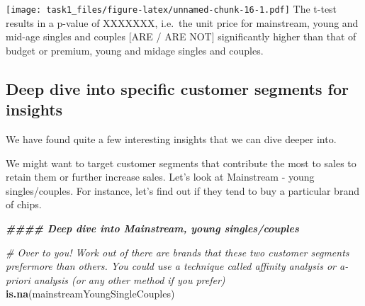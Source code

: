\documentclass[
]{article}
\newenvironment{Shaded}{\begin{snugshade}}{\end{snugshade}}
\newcommand{\CommentTok}[1]{\textcolor[rgb]{0.56,0.35,0.01}{\textit{#1}}}
\newcommand{\DocumentationTok}[1]{\textcolor[rgb]{0.56,0.35,0.01}{\textbf{\textit{#1}}}}
\newcommand{\FunctionTok}[1]{\textcolor[rgb]{0.13,0.29,0.53}{\textbf{#1}}}
\newcommand{\NormalTok}[1]{#1}
\begin{document}
\texttt{[image: task1\_files/figure-latex/unnamed-chunk-16-1.pdf]} The
t-test results in a p-value of XXXXXXX, i.e.~the unit price for
mainstream, young and mid-age singles and couples {[}ARE / ARE NOT{]}
significantly higher than that of budget or premium, young and midage
singles and couples.

\subsection{Deep dive into specific customer segments for
insights}\label{deep-dive-into-specific-customer-segments-for-insights}

We have found quite a few interesting insights that we can dive deeper
into.

We might want to target customer segments that contribute the most to
sales to retain them or further increase sales. Let's look at Mainstream
- young singles/couples. For instance, let's find out if they tend to
buy a particular brand of chips.

\begin{Shaded}
\begin{Highlighting}[]
\DocumentationTok{\#\#\#\# Deep dive into Mainstream, young singles/couples}

\CommentTok{\# Over to you! Work out of there are brands that these two customer segments prefermore than others. You could use a technique called affinity analysis or a{-}priori analysis (or any other method if you prefer)}
\FunctionTok{is.na}\NormalTok{(mainstreamYoungSingleCouples)}
\end{Highlighting}
\end{Shaded}
\end{document}
